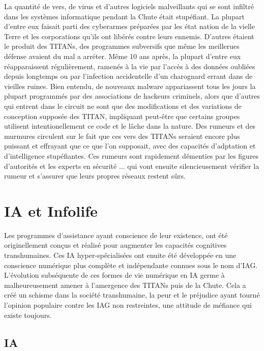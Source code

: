 La quantité de vers, de virus et d'autres logiciels malveillants qui se sont infiltré dans les systèmes informatique pendant la Chute était stupéfiant. La plupart d'entre eux faisait parti des cyberarmes préparées par les état nation de la vielle Terre et les corporations qu'ils ont libérés contre leurs ennemis. D'autres étaient le produit des TITANs, des programmes subversifs que même les meillerues défense avaient du mal a arréter. Même 10 ans après, la plupart d'entre eux réapparaissent régulièrement, ramenés à la vie par l'accès à des données oubliées depuis longtemps ou par l'infection accidentelle d'un charognard errant dans de vieilles ruines. Bien entendu, de nouveaux malware appariassent tous les jours la plupart programmés par des associations de hackeurs criminels, alors que d'autres qui entrent dans le circuit ne sont que des modifications et des variations de conception supposée des TITAN, impliquant peut-être que certains groupes utilisent intentionellement ce code et le lâche dans la nature. Des rumeurs et des murmures circulent sur le fait que ces vers des TITANs seraient encore plus puissant et effrayant que ce que l'on supposait, avec des capacités d'adptation et d'intelligence stupéfiantes. Ces rumeurs sont rapidement démenties par les figures d'autorités et les experts en sécurité ... qui vont ensuite silencieusement vérifier la rumeur et s'assurer que leurs propres réseaux restent sûrs. 

\section{IA et Infolife} 

Les programmes d'assistance ayant conscience de leur existence, ont été originellement conçus et réalisé pour augmenter les capacités cognitives transhumaines. Ces IA hyper-spécialisées ont enuite été développée en une conscience numérique plus complète et indépendante connues sous le nom d'IAG. L'évolution subséquente de ces formes de vie numérique en IA germe à malheureusement amener à l'amergence des TITANs puis de la Chute. Cela a créé un schisme dans la société transhumaine, la peur et le préjudice ayant tourné l'opinion populaire contre les IAG non restreintes, une attitude de méfiance qui existe toujours. 

\subsection{IA} 

